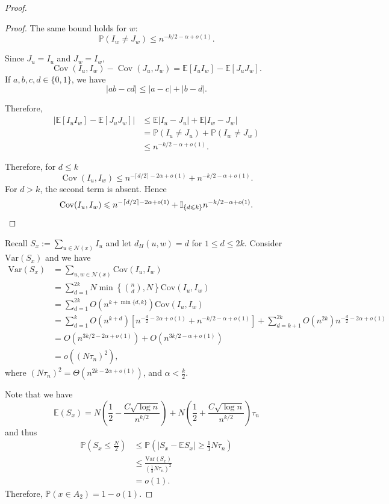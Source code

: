 \documentclass[reqno,11pt]{amsart}
\renewcommand{\le}{\leqslant}
\renewcommand{\leq}{\leqslant}
\renewcommand{\geq}{\geqslant}
\begin{document}
\begin{proof}
\begin{proof}
The same bound holds for $w$:
$$
\mathbb P(I_w\ne J_w)
\le
n^{-k/2-\alpha+o(1)}.
$$

Since $J_u=I_u$ and $J_w=I_w$, 
$$
\operatorname{Cov}(I_u,I_w)
-\operatorname{Cov}(J_u,J_w)
=
\mathbb E[I_uI_w]-\mathbb E[J_uJ_w].
$$
If $a,b,c,d \in \{0,1\}$, we have 
$$|ab-cd|
\le |a-c|+|b-d|.$$


Therefore,
\begin{align*}
\left|
\mathbb E[I_uI_w]-\mathbb E[J_uJ_w]
\right|
&\le
\mathbb E|I_u-J_u|
+
\mathbb E|I_w-J_w|\\
&=
\mathbb P(I_u\ne J_u)
+
\mathbb P(I_w\ne J_w)\\
&\le
n^{-k/2-\alpha+o(1)}.
\end{align*}


Therefore, for $d \le k$
$$
\operatorname{Cov}(I_u,I_w)
\le
n^{-\lceil d/2\rceil-2\alpha+o(1)}
+
n^{-k/2-\alpha+o(1)}. 
$$
For $d>k$, the second term is absent. Hence
$$
\operatorname{Cov}(I_u,I_w)
\le
n^{-\lceil d/2\rceil-2\alpha+o(1)}
+
\mathbb{I}_{\{d\le k\}}
n^{-k/2-\alpha+o(1)}. \qedhere
$$

\end{proof}
Recall $S_x:=\sum_{u \in \mathcal{N}(x)}I_u$ and let $d_H(u,w)=d$ for $1 \leq d \leq 2k$. Consider $\text{Var}(S_x)$ and we have 
\begin{align*}
\text{Var}(S_x) &=\sum_{u,w \in \mathcal{N}(x)}\text{Cov}(I_u,I_w)\\
& = \sum_{d=1}^{2k}N \min \left\{\binom{n}{d},N \right\}\text{Cov}(I_u,I_w)\\
&= \sum_{d=1}^{2k}O(n^{k+ \min\{d,k\}})\text{Cov}(I_u,I_w)\\
&=\sum_{d=1}^k O(n^{k+d})[n^{-\frac{d}{2}-2\alpha+o(1)}+n^{-k/2-\alpha+o(1)}]+\sum_{d=k+1}^{2k}O(n^{2k})n^{-\frac{d}{2}-2\alpha+o(1)}\\
& =O(n^{3k/2-2\alpha+o(1)})+O(n^{3k/2-\alpha+o(1)})\\
&=o((N\tau_n)^2),
\end{align*}
where $(N\tau_n)^2=\Theta(n^{2k-2\alpha +o(1)})$, and $\alpha < \frac{k}{2}$. 

Note that we have $$\mathbb{E}(S_x)=N\left(\frac{1}{2}-\frac{C\sqrt{\log n}}{n^{k/2}} \right)+N\left(\frac{1}{2}+\frac{C\sqrt{\log n}}{n^{k/2}} \right)\tau_n$$
and thus 
\begin{align*}
    \mathbb{P}(S_x \leq \frac{N}{2}) &\leq \mathbb{P}(|S_x-\mathbb{E}S_x| \geq \frac{1}{3}N\tau_n)\\
    & \leq \frac{\text{Var}(S_x)}{(\frac{1}{3}N\tau_n)^2}\\
    &= o(1). 
\end{align*}
Therefore, 
$\mathbb{P}(x \in A_2)=1-o(1)$. 
\end{proof}
\end{document}
